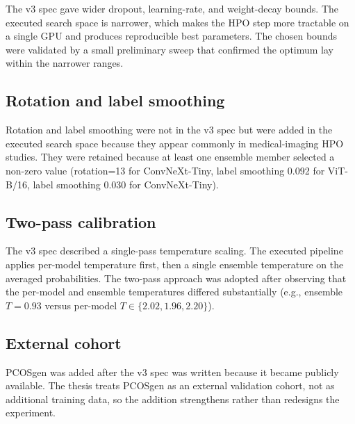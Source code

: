 \documentclass[../preamble.tex]{subfiles}
\begin{document}
The v3 spec gave wider dropout, learning-rate, and weight-decay bounds.
The executed search space is narrower, which makes the HPO step more
tractable on a single GPU and produces reproducible best parameters. The
chosen bounds were validated by a small preliminary sweep that confirmed
the optimum lay within the narrower ranges.

\subsection*{Rotation and label smoothing}

Rotation and label smoothing were not in the v3 spec but were added in the
executed search space because they appear commonly in medical-imaging HPO
studies. They were retained because at least one ensemble member selected
a non-zero value (rotation=13 for ConvNeXt-Tiny, label smoothing 0.092 for
ViT-B/16, label smoothing 0.030 for ConvNeXt-Tiny).

\subsection*{Two-pass calibration}

The v3 spec described a single-pass temperature scaling. The executed
pipeline applies per-model temperature first, then a single ensemble
temperature on the averaged probabilities. The two-pass approach was
adopted after observing that the per-model and ensemble temperatures
differed substantially (e.g., ensemble $T = 0.93$ versus per-model
$T \in \{2.02, 1.96, 2.20\}$).

\subsection*{External cohort}

PCOSgen was added after the v3 spec was written because it became publicly
available. The thesis treats PCOSgen as an external validation cohort, not
as additional training data, so the addition strengthens rather than
redesigns the experiment.
\end{document}
